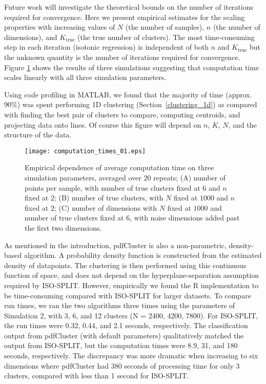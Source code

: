 \documentclass[10pt]{article}
\begin{document}
Future work will investigate the theoretical bounds on the number of iterations required for convergence. Here we present empirical estimates for the scaling properties with increasing values of $N$ (the number of samples), $n$ (the number of dimensions), and $K_\text{true}$ (the true number of clusters). The most time-consuming step in each iteration (isotonic regression) is independent of both $n$ and $K_\text{true}$ but the unknown quantity is the number of iterations required for convergence. Figure \ref{fig:computation_times_01} shows the results of three simulations suggesting that computation time scales linearly with all three simulation parameters.

Using code profiling in MATLAB, we found that the majority of time (approx. 90\%) was spent performing 1D clustering (Section~\ref{clustering_1d}) as compared with finding the best pair of clusters to compare, computing centroids, and projecting data onto lines. Of course this figure will depend on $n$, $K$, $N$, and the structure of the data.

\begin{figure}
\begin{center}
\texttt{[image: computation\_times\_01.eps]}
\end{center}
\caption{
Empirical dependence of average computation time on three simulation parameters, averaged over $20$ repeats; (A) number of points per sample, with number of true clusters fixed at $6$ and $n$ fixed at $2$; (B) number of true clusters, with $N$ fixed at $1000$ and $n$ fixed at $2$; (C) number of dimensions with $N$ fixed at $1000$ and number of true clusters fixed at $6$, with noise dimensions added past the first two dimensions.
}
\label{fig:computation_times_01}
\end{figure}

As mentioned in the introduction, pdfCluster \cite{pdfcluster} is also a non-parametric, density-based algorithm. A probability density function is constructed from the estimated density of datapoints. The clustering is then performed using this continuous function of space, and does not depend on the hyperplane-separation assumption required by ISO-SPLIT. However, empirically we found the R implementation \cite{pdfclusterR} to be time-consuming compared with ISO-SPLIT for larger datasets. To compare run times, we ran the two algorithms three times using the parameters of Simulation 2, with 3, 6, and 12 clusters (N = 2400, 4200, 7800). For ISO-SPLIT, the run times were 0.32, 0.44, and 2.1 seconds, respectively. The classification output from pdfCluster (with default parameters) qualitatively matched the output from ISO-SPLIT, but the computation times were 8.9, 31, and 180 seconds, respectively. The discrepancy was more dramatic when increasing to six dimensions where pdfCluster had 380 seconds of processing time for only 3 clusters, compared with less than 1 second for ISO-SPLIT.
\end{document}
